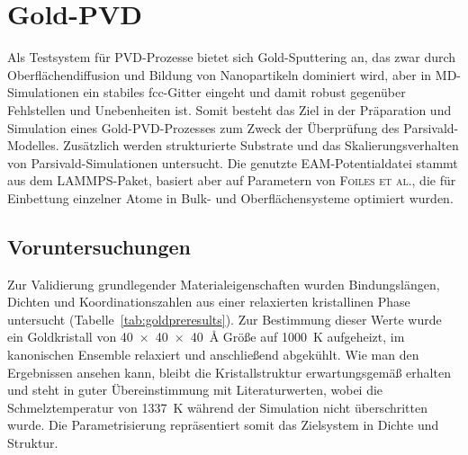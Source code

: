 \section{Gold-PVD}
\label{goldpvd}

Als Testsystem für PVD-Prozesse bietet sich Gold-Sputtering an, das zwar durch Oberflächendiffusion und Bildung von Nanopartikeln dominiert wird, aber in MD-Simulationen ein stabiles fcc-Gitter eingeht und damit robust gegenüber Fehlstellen und Unebenheiten ist.
Somit besteht das Ziel in der Präparation und Simulation eines Gold-PVD-Prozesses zum Zweck der Überprüfung des Parsivald-Modelles.
Zusätzlich werden strukturierte Substrate und das Skalierungsverhalten von Parsivald-Simulationen untersucht.
Die genutzte EAM-Potentialdatei stammt aus dem LAMMPS-Paket\cite{plimpton_lammps_2014}, basiert aber auf Parametern von \textsc{Foiles et al.}\cite{foiles_embedded-atom-method_1986}, die für Einbettung einzelner Atome in Bulk- und Oberflächensysteme optimiert wurden.

\subsection{Voruntersuchungen}

Zur Validierung grundlegender Materialeigenschaften wurden Bindungslängen, Dichten und Koordinationszahlen aus einer relaxierten kristallinen Phase untersucht (Tabelle~\ref{tab:goldpreresults}).
Zur Bestimmung dieser Werte wurde ein Goldkristall von \SI{40x40x40}{\angstrom} Größe auf \SI{1000}{\kelvin} aufgeheizt, im kanonischen Ensemble relaxiert und anschließend abgekühlt.
Wie man den Ergebnissen ansehen kann, bleibt die Kristallstruktur erwartungsgemäß erhalten und steht in guter Übereinstimmung mit Literaturwerten, wobei die Schmelztemperatur von \SI{1337}{\kelvin} während der Simulation nicht überschritten wurde.
Die Parametrisierung repräsentiert somit das Zielsystem in Dichte und Struktur.

